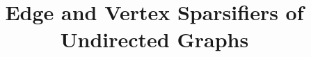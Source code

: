 \documentclass[12pt]{article}
\begin{document}
    \title{Edge and Vertex Sparsifiers of Undirected Graphs}
    \date{}
    \maketitle
\end{document}
